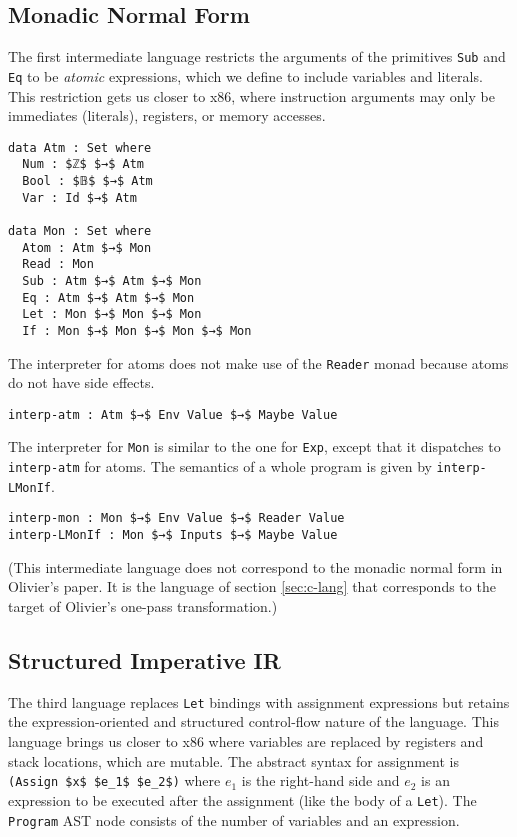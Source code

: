 \documentclass[sigplan,screen]{acmart}
\begin{document}
\subsection{Monadic Normal Form}

The first intermediate language restricts the arguments of the
primitives \lstinline{Sub} and \lstinline{Eq} to be \emph{atomic}
expressions, which we define to include variables and literals. This
restriction gets us closer to x86, where instruction arguments may
only be immediates (literals), registers, or memory accesses.

\begin{lstlisting}
data Atm : Set where
  Num : $ℤ$ $→$ Atm 
  Bool : $𝔹$ $→$ Atm 
  Var : Id $→$ Atm

data Mon : Set where
  Atom : Atm $→$ Mon
  Read : Mon
  Sub : Atm $→$ Atm $→$ Mon
  Eq : Atm $→$ Atm $→$ Mon
  Let : Mon $→$ Mon $→$ Mon
  If : Mon $→$ Mon $→$ Mon $→$ Mon
\end{lstlisting}

The interpreter for atoms does not make use of the \lstinline{Reader}
monad because atoms do not have side effects.

\begin{lstlisting}
interp-atm : Atm $→$ Env Value $→$ Maybe Value
\end{lstlisting}

The interpreter for \lstinline{Mon} is similar to the
one for \lstinline{Exp}, except that it dispatches
to \lstinline{interp-atm} for atoms. The semantics
of a whole program is given by \lstinline{interp-LMonIf}.

\begin{lstlisting}
interp-mon : Mon $→$ Env Value $→$ Reader Value
interp-LMonIf : Mon $→$ Inputs $→$ Maybe Value
\end{lstlisting}

(This intermediate language does not correspond to the monadic normal
form in Olivier's paper. It is the language of section
\ref{sec:c-lang} that corresponds to the target of Olivier's one-pass
transformation.)

\subsection{Structured Imperative IR}
\label{sec:imp}

The third language replaces \lstinline{Let} bindings with assignment
expressions but retains the expression-oriented and structured
control-flow nature of the language. This language brings us closer to
x86 where variables are replaced by registers and stack locations,
which are mutable. The abstract syntax for assignment is
\lstinline{(Assign $x$ $e_1$ $e_2$)} where $e_1$ is the right-hand
side and $e_2$ is an expression to be executed after the assignment
(like the body of a \lstinline{Let}).  The \lstinline{Program} AST
node consists of the number of variables and an expression.
\end{document}
